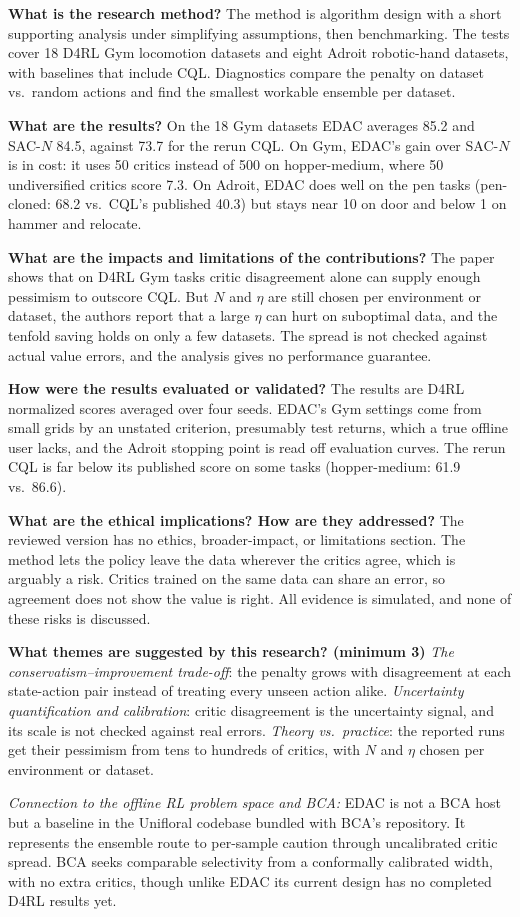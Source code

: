 \documentclass[11pt]{article}
\newcommand{\q}[2]{\item \textbf{#1} #2}
\newcommand{\tiein}[1]{\par\smallskip\noindent\emph{Connection to the offline RL problem space and BCA:} #1\par\medskip}
\begin{document}
\begin{qna}
\q{What is the research method?}
The method is algorithm design with a short supporting analysis under simplifying assumptions, then benchmarking. The tests cover 18 D4RL Gym locomotion datasets and eight Adroit robotic-hand datasets, with baselines that include CQL. Diagnostics compare the penalty on dataset vs.\ random actions and find the smallest workable ensemble per dataset.

\q{What are the results?}
On the 18 Gym datasets EDAC averages 85.2 and SAC-$N$ 84.5, against 73.7 for the rerun CQL. On Gym, EDAC's gain over SAC-$N$ is in cost: it uses 50 critics instead of 500 on hopper-medium, where 50 undiversified critics score 7.3. On Adroit, EDAC does well on the pen tasks (pen-cloned: 68.2 vs.\ CQL's published 40.3) but stays near 10 on door and below 1 on hammer and relocate.

\q{What are the impacts and limitations of the contributions?}
The paper shows that on D4RL Gym tasks critic disagreement alone can supply enough pessimism to outscore CQL. But $N$ and $\eta$ are still chosen per environment or dataset, the authors report that a large $\eta$ can hurt on suboptimal data, and the tenfold saving holds on only a few datasets. The spread is not checked against actual value errors, and the analysis gives no performance guarantee.

\q{How were the results evaluated or validated?}
The results are D4RL normalized scores averaged over four seeds. EDAC's Gym settings come from small grids by an unstated criterion, presumably test returns, which a true offline user lacks, and the Adroit stopping point is read off evaluation curves. The rerun CQL is far below its published score on some tasks (hopper-medium: 61.9 vs.\ 86.6).

\q{What are the ethical implications? How are they addressed?}
The reviewed version has no ethics, broader-impact, or limitations section. The method lets the policy leave the data wherever the critics agree, which is arguably a risk. Critics trained on the same data can share an error, so agreement does not show the value is right. All evidence is simulated, and none of these risks is discussed.

\q{What themes are suggested by this research? (minimum 3)}
\emph{The conservatism--improvement trade-off}: the penalty grows with disagreement at each state-action pair instead of treating every unseen action alike. \emph{Uncertainty quantification and calibration}: critic disagreement is the uncertainty signal, and its scale is not checked against real errors. \emph{Theory vs.\ practice}: the reported runs get their pessimism from tens to hundreds of critics, with $N$ and $\eta$ chosen per environment or dataset.

\end{qna}
\tiein{EDAC is not a BCA host but a baseline in the Unifloral codebase bundled with BCA's repository. It represents the ensemble route to per-sample caution through uncalibrated critic spread. BCA seeks comparable selectivity from a conformally calibrated width, with no extra critics, though unlike EDAC its current design has no completed D4RL results yet.}
\end{document}
